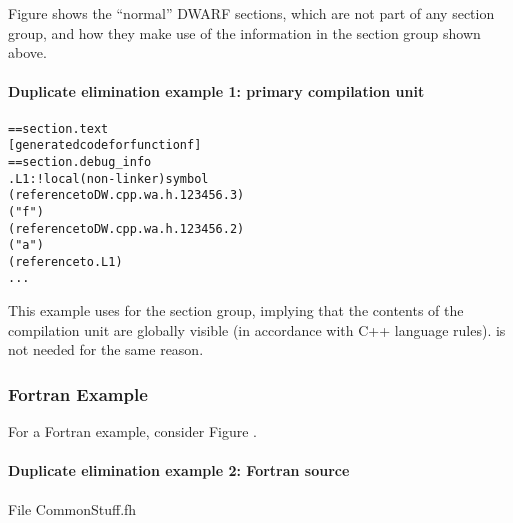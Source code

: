 Figure 
shows the ``normal'' DWARF sections, which are not part of
any section group, and how they make use of the information
in the section group shown above.

\paragraph{Duplicate elimination example 1: primary compilation unit} 
\label{app:duplicateeliminationexample1primarycompilationunit}
\begin{alltt}
== section .text
    [generated code for function f]
== section .debug\_info
.L1:                   ! local (non-linker) symbol
            (reference to DW.cpp.wa.h.123456.3)
            ("f")
            (reference to DW.cpp.wa.h.123456.2)
                ("a")
                (reference to .L1)
        ...
\end{alltt}

This example uses  for the section group,
implying that the contents of the compilation unit are
globally visible (in accordance with C++ language rules).
 is not needed for the same reason.

\subsubsection{Fortran Example}


For a Fortran example, consider 
Figure .


\paragraph{Duplicate elimination example 2: Fortran source} 
\label{app:duplicateeliminationexample2fortransource}

File CommonStuff.fh

